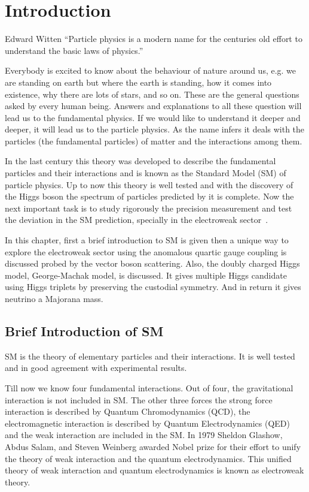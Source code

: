 \chapter{Introduction}
\begin{chapquote}
{Edward Witten}
``Particle physics is a modern name for the centuries old effort to understand the basic laws of physics.''
\end{chapquote}
%
%

Everybody is excited to know about the behaviour of nature around us, e.g. we are standing on earth but where the earth is standing, how it comes into existence, why there are lots of stars, and so on.
These are the general questions asked by every human being. Answers and explanations to all these question will lead us to the fundamental physics.
If we would like to understand it deeper and deeper, it will lead us to the particle physics.
As the name infers it deals with the particles (the fundamental particles) of matter and the interactions among them.

In the last century this theory was developed to describe the fundamental particles and their interactions and is known as the Standard Model (SM) of particle physics.
Up to now this theory is well tested and with the discovery of the Higgs boson the spectrum of particles predicted by it is complete.
Now the next important task is to study rigorously the precision measurement and test the deviation in the SM prediction, specially in the electroweak sector~\cite{Baak2013}.

In this chapter, first a brief introduction to SM is given then a unique way to explore the electroweak sector using the anomalous quartic gauge coupling is discussed probed by the vector boson scattering. Also, the doubly charged Higgs model, George-Machak model, is discussed. It gives multiple Higgs candidate using Higgs triplets by preserving the custodial symmetry. And in return it gives neutrino a Majorana mass.


\section{Brief Introduction of SM} %
\label{sec:brief_introduction_of_sm}
SM is the theory of elementary particles and their interactions. It is well tested and in good agreement with experimental results.

Till now we know four fundamental interactions. Out of four, the gravitational interaction is not included in SM. The other three forces the strong force interaction is described by Quantum Chromodynamics (QCD), the electromagnetic interaction is described by Quantum Electrodynamics (QED) and the weak interaction are included in the SM. In 1979 Sheldon Glashow, Abdus Salam, and Steven Weinberg awarded Nobel prize for their effort to unify the theory of weak interaction and the quantum electrodynamics. This unified theory of weak interaction and quantum electrodynamics is known as electroweak theory.

